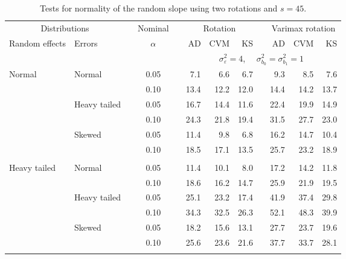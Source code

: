 \begin{table}[ht]
\caption{\label{tab:simb1s45-alt}Tests for normality of the random slope using two rotations and $s = 45$.}
\begin{scriptsize}
\begin{center}
\begin{tabular}{ll p{.1cm} c p{.1cm} rrr p{.1cm} rrr}
  \hline
  \multicolumn{2}{c}{Distributions}& & Nominal & &  \multicolumn{3}{c}{Rotation} & & \multicolumn{3}{c}{Varimax rotation} \\ \cline{1-2} \cline{6-8} \cline{10-12}   
  Random effects & Errors & & $\alpha$ & & AD & CVM & KS & & AD & CVM & KS \\ 
   \hline
& && && \multicolumn{7}{c}{$\sigma_{\varepsilon}^2 = 4$, \ \ $\sigma_{b_0}^2 = \sigma_{b_1}^2 = 1$} \\ \cline{6-12}
\rowcolor{gray!20}Normal       & Normal       && 0.05 &&   7.1 & 6.6 & 6.7 &   & 9.3 & 8.5 & 7.6 \\ 
\rowcolor{gray!20}             &              && 0.10 &&   13.4 & 12.2 & 12.0 &   & 14.4 & 14.2 & 13.7 \\ 
\rowcolor{gray!20}             & Heavy tailed && 0.05 &&   16.7 & 14.4 & 11.6 &   & 22.4 & 19.9 & 14.9 \\ 
\rowcolor{gray!20}             &              && 0.10 &&   24.3 & 21.8 & 19.4 &   & 31.5 & 27.7 & 23.0 \\ 
\rowcolor{gray!20}             & Skewed       && 0.05 &&   11.4 & 9.8 & 6.8 &   & 16.2 & 14.7 & 10.4 \\ 
\rowcolor{gray!20}             &              && 0.10 &&   18.5 & 17.1 & 13.5 &   & 25.7 & 23.2 & 18.9 \\ 
&&&&&&&&&&&\\
Heavy tailed & Normal       && 0.05 &&   11.4 & 10.1 & 8.0 &   & 17.2 & 14.2 & 11.8 \\ 
             &              && 0.10 &&   18.6 & 16.2 & 14.7 &   & 25.9 & 21.9 & 19.5 \\ 
             & Heavy tailed && 0.05 &&   25.1 & 23.2 & 17.4 &   & 41.9 & 37.4 & 29.8 \\ 
             &              && 0.10 &&   34.3 & 32.5 & 26.3 &   & 52.1 & 48.3 & 39.9 \\ 
             & Skewed       && 0.05 &&   18.2 & 15.6 & 13.1 &   & 27.7 & 23.7 & 19.6 \\ 
             &              && 0.10 &&   25.6 & 23.6 & 21.6 &   & 37.7 & 33.7 & 28.1 \\ 
&&&&&&&&&&&\\

\end{tabular}
\end{center}
\end{scriptsize}
\end{table}
